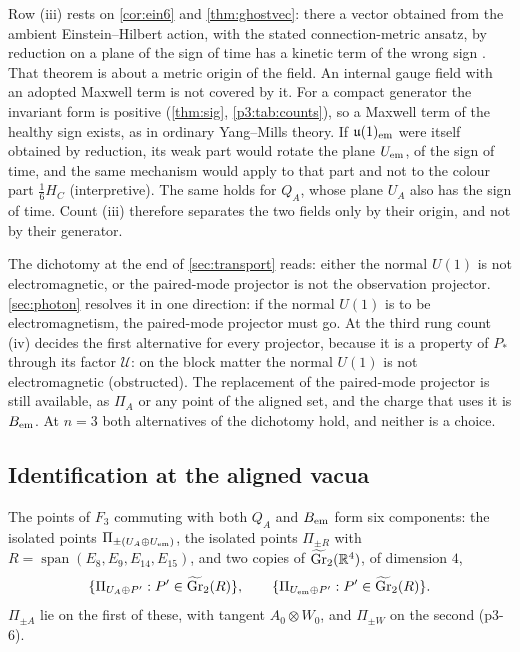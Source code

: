 Row (iii) rests on \cref{cor:ein6} and \cref{thm:ghostvec}: there a vector obtained from the ambient Einstein--Hilbert action, with the stated connection-metric ansatz, by
reduction on a plane of the sign of time has a kinetic term of the wrong sign \cite{Hull98}. That theorem is about a metric origin of the field. An internal gauge field with an adopted Maxwell term is not covered by it. For a compact generator
the invariant form is positive (\cref{thm:sig}, \cref{p3:tab:counts}), so a Maxwell term of the healthy sign exists, as in ordinary Yang--Mills theory. If $\mathfrak{u}(1)_{\rm em}$
were itself obtained by reduction, its weak part would rotate the plane $U_{\rm em}$, of the sign of time, and the same mechanism would apply to that part and not to the
colour part $\tfrac16H_C$ (interpretive). The same holds for $Q_A$, whose plane $U_A$ also has the sign of time. Count (iii) therefore separates the two fields only by
their origin, and not by their generator.

The dichotomy at the end of \cref{sec:transport} reads: either the normal $U(1)$ is not electromagnetic, or the paired-mode projector is not the observation projector.
\cref{sec:photon} resolves it in one direction: if the normal $U(1)$ is to be electromagnetism, the paired-mode projector must go. At the third rung count (iv)
decides the first alternative for every projector, because it is a property of $P_*$ through its factor $\mathcal U$: on the block matter the normal $U(1)$ is not electromagnetic
(obstructed). The replacement of the paired-mode projector is still available, as $\Pi_A$ or any point of the aligned set, and the charge that uses it is $B_{\rm em}$.
At $n=3$ both alternatives of the dichotomy hold, and neither is a choice.

\subsection{Identification at the aligned vacua}
\label{p3:sec:ident}

\begin{proposition}
\label{p3:prop:jointfixed}
The points of $F_3$ commuting with both $Q_A$ and $B_{\rm em}$ form six components: the isolated points $\Pi_{\pm(U_A\oplus U_{\rm em})}$, the isolated points $\Pi_{\pm R}$ with
$R=\operatorname{span}(E_8,E_9,E_{14},E_{15})$, and two copies of $\widetilde{\mathrm{Gr}}_2(\mathbb{R}^4)$, of dimension $4$,
\[
\{\Pi_{U_A\oplus P'}:P'\in\widetilde{\mathrm{Gr}}_2(R)\},\qquad\{\Pi_{U_{\rm em}\oplus P'}:P'\in\widetilde{\mathrm{Gr}}_2(R)\}.
\]
$\Pi_{\pm A}$ lie on the first of these, with tangent $A_0\otimes W_0$, and $\Pi_{\pm W}$ on the second (p3-6).
\end{proposition}

